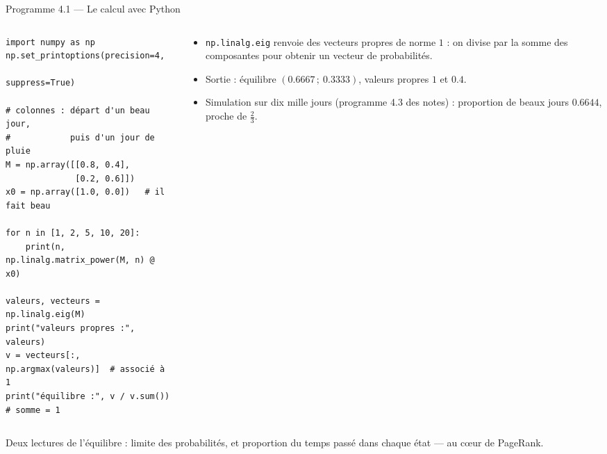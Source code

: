 \begin{frame}[fragile]{Programme 4.1 --- Le calcul avec Python}
  \begin{columns}[T]
    \begin{column}{0.6\textwidth}
\begin{lstlisting}
import numpy as np
np.set_printoptions(precision=4,
                    suppress=True)

# colonnes : départ d'un beau jour,
#            puis d'un jour de pluie
M = np.array([[0.8, 0.4],
              [0.2, 0.6]])
x0 = np.array([1.0, 0.0])   # il fait beau

for n in [1, 2, 5, 10, 20]:
    print(n, np.linalg.matrix_power(M, n) @ x0)

valeurs, vecteurs = np.linalg.eig(M)
print("valeurs propres :", valeurs)
v = vecteurs[:, np.argmax(valeurs)]  # associé à 1
print("équilibre :", v / v.sum())    # somme = 1
\end{lstlisting}
    \end{column}
    \begin{column}{0.38\textwidth}
      \small
      \begin{itemize}
        \item \texttt{np.linalg.eig} renvoie des vecteurs propres de
          norme $1$ : on divise par la somme des composantes pour obtenir
          un vecteur de probabilités.
        \item Sortie : équilibre $(\num{0.6667}\,;\ \num{0.3333})$,
          valeurs propres $1$ et $\num{0.4}$.
        \item Simulation sur dix mille jours (programme 4.3 des notes) :
          proportion de beaux jours $\num{0.6644}$, proche de $\tfrac23$.
      \end{itemize}
    \end{column}
  \end{columns}
  \vspace{2pt}
  \small Deux lectures de l'équilibre : limite des probabilités, et
  proportion du temps passé dans chaque état --- au cœur de PageRank.
\end{frame}

